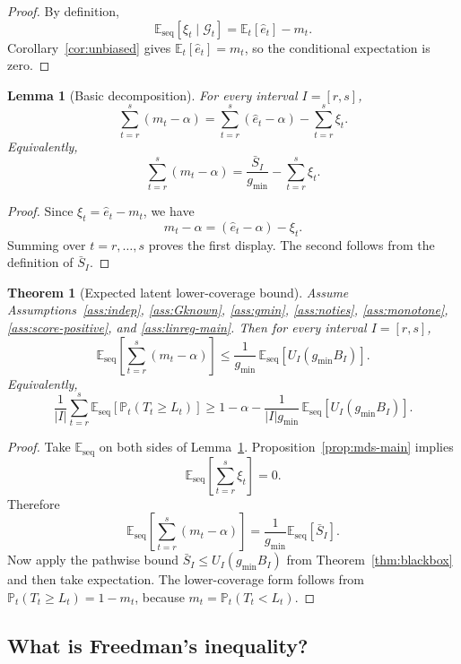 \documentclass[11pt]{article}
\newtheorem{theorem}{Theorem}
\newtheorem{lemma}{Lemma}
\newcommand{\E}{\mathbb{E}}
\newcommand{\Prob}{\mathbb{P}}
\newcommand{\1}{\mathbf{1}}
\newcommand{\seq}{\mathrm{seq}}
\newcommand{\cG}{\mathcal{G}}
\begin{document}
\begin{proof}
By definition,
\[
\E_{\seq}[\xi_t\mid \cG_t]
=
\E_t[\hat e_t]-m_t.
\]
Corollary~\ref{cor:unbiased} gives $\E_t[\hat e_t]=m_t$, so the conditional expectation is zero.
\end{proof}

\begin{lemma}[Basic decomposition]
\label{lem:basic-decomp-main}
For every interval $I=[r,s]$,
\begin{equation}
\label{eq:basic-decomp}
\sum_{t=r}^s(m_t-\alpha)
=
\sum_{t=r}^s(\hat e_t-\alpha)-\sum_{t=r}^s\xi_t.
\end{equation}
Equivalently,
\[
\sum_{t=r}^s(m_t-\alpha)
=
\frac{\bar S_I}{g_{\min}}-\sum_{t=r}^s\xi_t.
\]
\end{lemma}

\begin{proof}
Since $\xi_t=\hat e_t-m_t$, we have
\[
m_t-\alpha=(\hat e_t-\alpha)-\xi_t.
\]
Summing over $t=r,\dots,s$ proves the first display. The second follows from the definition of $\bar S_I$.
\end{proof}

\begin{theorem}[Expected latent lower-coverage bound]
\label{thm:expectation-main}
Assume Assumptions~\ref{ass:indep}, \ref{ass:Gknown}, \ref{ass:gmin}, \ref{ass:noties}, \ref{ass:monotone}, \ref{ass:score-positive}, and \ref{ass:linreg-main}. Then for every interval $I=[r,s]$,
\[
\E_{\seq}\!\left[\sum_{t=r}^s(m_t-\alpha)\right]
\le
\frac{1}{g_{\min}}\,\E_{\seq}\!\left[U_I(g_{\min}B_I)\right].
\]
Equivalently,
\[
\frac{1}{|I|}\sum_{t=r}^s \E_{\seq}\!\left[\Prob_t(T_t\ge L_t)\right]
\ge
1-\alpha-
\frac{1}{|I|g_{\min}}\,\E_{\seq}\!\left[U_I(g_{\min}B_I)\right].
\]
\end{theorem}

\begin{proof}
Take $\E_{\seq}$ on both sides of Lemma~\ref{lem:basic-decomp-main}. Proposition~\ref{prop:mds-main} implies
\[
\E_{\seq}\!\left[\sum_{t=r}^s\xi_t\right]=0.
\]
Therefore
\[
\E_{\seq}\!\left[\sum_{t=r}^s(m_t-\alpha)\right]
=
\frac{1}{g_{\min}}\E_{\seq}[\bar S_I].
\]
Now apply the pathwise bound $\bar S_I\le U_I(g_{\min}B_I)$ from Theorem~\ref{thm:blackbox} and then take expectation. The lower-coverage form follows from $\Prob_t(T_t\ge L_t)=1-m_t$, because $m_t=\Prob_t(T_t<L_t)$.
\end{proof}

\subsection{What is Freedman's inequality?}
\end{document}

